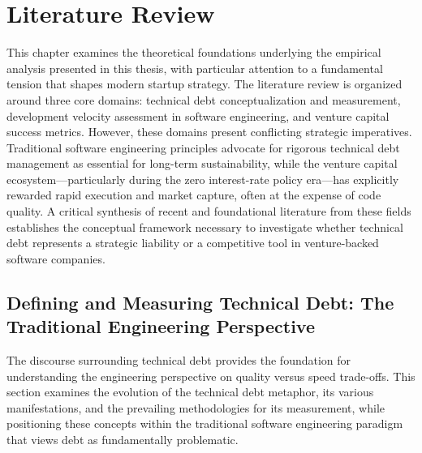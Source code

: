 \chapter{Literature Review}\label{sec:literature_review}

This chapter examines the theoretical foundations underlying the empirical analysis presented in this thesis, with particular attention to a fundamental tension that shapes modern startup strategy. The literature review is organized around three core domains: technical debt conceptualization and measurement, development velocity assessment in software engineering, and venture capital success metrics. However, these domains present conflicting strategic imperatives. Traditional software engineering principles advocate for rigorous technical debt management as essential for long-term sustainability, while the venture capital ecosystem—particularly during the zero interest-rate policy era—has explicitly rewarded rapid execution and market capture, often at the expense of code quality. A critical synthesis of recent and foundational literature from these fields establishes the conceptual framework necessary to investigate whether technical debt represents a strategic liability or a competitive tool in venture-backed software companies.

\section{Defining and Measuring Technical Debt: The Traditional Engineering Perspective}\label{sec:technical_debt_literature}

The discourse surrounding technical debt provides the foundation for understanding the engineering perspective on quality versus speed trade-offs. This section examines the evolution of the technical debt metaphor, its various manifestations, and the prevailing methodologies for its measurement, while positioning these concepts within the traditional software engineering paradigm that views debt as fundamentally problematic.

